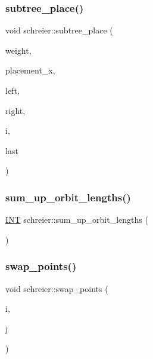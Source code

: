 \subsubsection{\texorpdfstring{subtree\+\_\+place()}{subtree\_place()}}
{\footnotesize\ttfamily void schreier\+::subtree\+\_\+place (\begin{DoxyParamCaption}\item[{\mbox{\hyperlink{galois_8h_a09fddde158a3a20bd2dcadb609de11dc}{I\+NT}} $\ast$}]{weight,  }\item[{\mbox{\hyperlink{galois_8h_a09fddde158a3a20bd2dcadb609de11dc}{I\+NT}} $\ast$}]{placement\+\_\+x,  }\item[{\mbox{\hyperlink{galois_8h_a09fddde158a3a20bd2dcadb609de11dc}{I\+NT}}}]{left,  }\item[{\mbox{\hyperlink{galois_8h_a09fddde158a3a20bd2dcadb609de11dc}{I\+NT}}}]{right,  }\item[{\mbox{\hyperlink{galois_8h_a09fddde158a3a20bd2dcadb609de11dc}{I\+NT}}}]{i,  }\item[{\mbox{\hyperlink{galois_8h_a09fddde158a3a20bd2dcadb609de11dc}{I\+NT}}}]{last }\end{DoxyParamCaption})}

\mbox{\label{classschreier_a120472d378feabec676062f84b23fc8e}} 
\subsubsection{\texorpdfstring{sum\+\_\+up\+\_\+orbit\+\_\+lengths()}{sum\_up\_orbit\_lengths()}}
{\footnotesize\ttfamily \mbox{\hyperlink{galois_8h_a09fddde158a3a20bd2dcadb609de11dc}{I\+NT}} schreier\+::sum\+\_\+up\+\_\+orbit\+\_\+lengths (\begin{DoxyParamCaption}{ }\end{DoxyParamCaption})}

\mbox{\label{classschreier_a2ffcc9098873cfbd14eca34ab4827db7}} 
\subsubsection{\texorpdfstring{swap\+\_\+points()}{swap\_points()}}
{\footnotesize\ttfamily void schreier\+::swap\+\_\+points (\begin{DoxyParamCaption}\item[{\mbox{\hyperlink{galois_8h_a09fddde158a3a20bd2dcadb609de11dc}{I\+NT}}}]{i,  }\item[{\mbox{\hyperlink{galois_8h_a09fddde158a3a20bd2dcadb609de11dc}{I\+NT}}}]{j }\end{DoxyParamCaption})}

